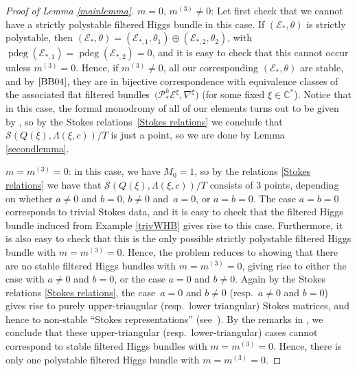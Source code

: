 \begin{proof}[Proof of Lemma \ref{mainlemma}]
$m=0$, $m^{(3)}\neq 0$: Let first check that we cannot have a strictly polystable filtered Higgs bundle in this case. If $(\mathcal{E}_*,\theta)$ is strictly polystable, then $(\mathcal{E}_*,\theta)=(\mathcal{E}_{*,1},\theta_1)\oplus(\mathcal{E}_{*,2},\theta_2)$, with $\operatorname{pdeg}(\mathcal{E}_{*,1})=\operatorname{pdeg}(\mathcal{E}_{*,2})=0$, and it is easy to check that this cannot occur unless $m^{(3)}=0$. Hence, if $m^{(3)}\neq 0$, all our corresponding $(\mathcal{E}_*,\theta)$ are stable, and by $\cite{BB04}$, they are in bijective correspondence with equivalence classes of the associated flat filtered bundles~${\bigl(\mathcal{P}^h_{*}\mathcal{E}^{\xi},\nabla^{\xi}\bigr)}$ (for some fixed $\xi \in \mathbb{C}^*$). Notice that in this case, the formal monodromy of all of our elements turns out to be given by , so by the Stokes relations~\eqref{Stokes relations} we conclude that $\mathcal{S}(Q(\xi),\Lambda(\xi,c))/T$ is just a point, so we are done by Lemma \ref{secondlemma}.

$m=m^{(3)}=0$: in this case, we have $M_0=1$, so by the relations \ref{Stokes relations} we have that $\mathcal{S}(Q(\xi),\Lambda(\xi,c))/T$ consists of $3$ points, depending on whether $a\neq 0$ and $b=0$, $b\neq 0$ and~${a=0}$, or $a=b=0$. The case $a=b=0$ corresponds to trivial Stokes data, and it is easy to check that the filtered Higgs bundle induced from Example \ref{trivWHB} gives rise to this case. Furthermore, it is also easy to check that this is the only possible strictly polystable filtered Higgs bundle with $m=m^{(3)}=0$. Hence, the problem reduces to showing that there are no stable filtered Higgs bundles with $m=m^{(3)}=0$, giving rise to either the case with $a\neq 0$ and $b=0$, or the case $a=0$ and $b\neq 0$. Again by the Stokes relations \eqref{Stokes relations}, the case~${a=0}$ and $b\neq 0$ (resp.\ $a\neq 0$ and $b=0$) gives rise to purely upper-triangular (resp.\ lower triangular) Stokes matrices, and hence to non-stable ``Stokes representations'' (see~\cite{B3}). By the remarks in \cite[p.\ 50]{B3}, we conclude that these upper-triangular (resp.\ lower-triangular) cases cannot correspond to stable filtered Higgs bundles with $m=m^{(3)}=0$. Hence, there is only one polystable filtered Higgs bundle with $m=m^{(3)}=0$.
\end{proof}
